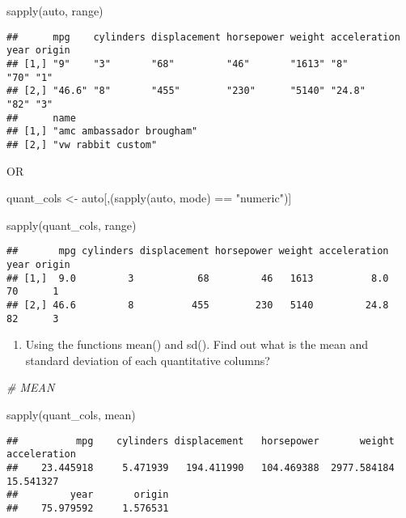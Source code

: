 \documentclass[
]{article}
\newenvironment{Shaded}{\begin{snugshade}}{\end{snugshade}}
\newcommand{\CommentTok}[1]{\textcolor[rgb]{0.56,0.35,0.01}{\textit{#1}}}
\newcommand{\FunctionTok}[1]{\textcolor[rgb]{0.00,0.00,0.00}{#1}}
\newcommand{\NormalTok}[1]{#1}
\newcommand{\OtherTok}[1]{\textcolor[rgb]{0.56,0.35,0.01}{#1}}
\newcommand{\SpecialCharTok}[1]{\textcolor[rgb]{0.00,0.00,0.00}{#1}}
\newcommand{\StringTok}[1]{\textcolor[rgb]{0.31,0.60,0.02}{#1}}
\providecommand{\tightlist}{%
  \setlength{\itemsep}{0pt}\setlength{\parskip}{0pt}}
\begin{document}
\begin{Shaded}
\begin{Highlighting}[]
\FunctionTok{sapply}\NormalTok{(auto, range)}
\end{Highlighting}
\end{Shaded}

\begin{verbatim}
##      mpg    cylinders displacement horsepower weight acceleration year origin
## [1,] "9"    "3"       "68"         "46"       "1613" "8"          "70" "1"   
## [2,] "46.6" "8"       "455"        "230"      "5140" "24.8"       "82" "3"   
##      name                     
## [1,] "amc ambassador brougham"
## [2,] "vw rabbit custom"
\end{verbatim}

OR

\begin{Shaded}
\begin{Highlighting}[]
\NormalTok{quant\_cols }\OtherTok{\textless{}{-}}\NormalTok{ auto[,(}\FunctionTok{sapply}\NormalTok{(auto, mode) }\SpecialCharTok{==} \StringTok{"numeric"}\NormalTok{)]}

\FunctionTok{sapply}\NormalTok{(quant\_cols, range)}
\end{Highlighting}
\end{Shaded}

\begin{verbatim}
##       mpg cylinders displacement horsepower weight acceleration year origin
## [1,]  9.0         3           68         46   1613          8.0   70      1
## [2,] 46.6         8          455        230   5140         24.8   82      3
\end{verbatim}

\begin{enumerate}
\def\labelenumi{\alph{enumi}.}
\setcounter{enumi}{1}
\tightlist
\item
  Using the functions mean() and sd(). Find out what is the mean and
  standard deviation of each quantitative columns?
\end{enumerate}

\begin{Shaded}
\begin{Highlighting}[]
\CommentTok{\# MEAN}

\FunctionTok{sapply}\NormalTok{(quant\_cols, mean)}
\end{Highlighting}
\end{Shaded}

\begin{verbatim}
##          mpg    cylinders displacement   horsepower       weight acceleration 
##    23.445918     5.471939   194.411990   104.469388  2977.584184    15.541327 
##         year       origin 
##    75.979592     1.576531
\end{verbatim}
\end{document}
